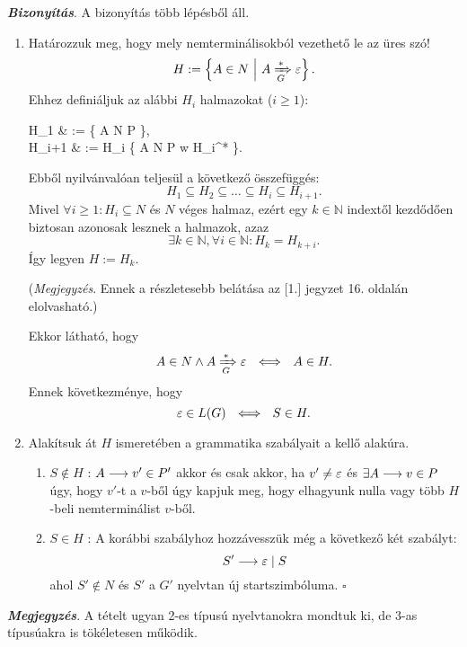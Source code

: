 \begin{mdframed}
	\textbf{\textit{Bizonyítás}}. A bizonyítás több lépésből áll.
	\begin{enumerate}[1.)]
		\item Határozzuk meg, hogy mely nemterminálisokból vezethető le az üres szó!
		\[ H := \left\{ A \in N ~ \middle\vert ~ A \xRightarrow[{G}]{*} \varepsilon \right\}. \]
		Ehhez definiáljuk az alábbi $H_i$ halmazokat ($i \geq 1$):
		\begin{flalign*}
			H_1 & := \left\{ A \in N \setdivbar \exists {} \in P \right\}, \\
			H_{i+1} & := H_i \cup \left\{ A \in N \setdivbar \exists {} \in P \land w \in H_i^* \right\}.
		\end{flalign*}
		Ebből nyilvánvalóan teljesül a következő összefüggés:
		\[ H_1 \subseteq H_2 \subseteq \dots \subseteq H_i \subseteq H_{i+1}. \] 
		Mivel $\forall i \geq 1: H_i \subseteq N$ és $N$ véges halmaz, ezért egy $k \in \mathbb{N}$ indextől kezdődően biztosan azonosak lesznek a halmazok, azaz \[ \exists k \in \mathbb{N}, \forall i \in \mathbb{N} : H_k = H_{k+i}. \] Így legyen $H := H_k$.
		
		(\textit{Megjegyzés}. Ennek a részletesebb belátása az [1.] jegyzet 16. oldalán elolvasható.)
		
		Ekkor látható, hogy 
		\[  A \in N \land A \xRightarrow[{G}]{*} \varepsilon ~~ \Longleftrightarrow ~~ A \in H. \] 
		Ennek következménye, hogy \[ \varepsilon \in L(G) ~~ \Longleftrightarrow ~~ S \in H. \]
		
		\item Alakítsuk át $H$ ismeretében a grammatika szabályait a kellő alakúra.
		\begin{enumerate}
			\item $\boxed{S \notin H}$ : $A \longrightarrow v'\in P'$ akkor és csak akkor, ha $v' \neq \varepsilon$ és $\exists A \longrightarrow v\in P$ úgy, hogy $v'$-t a $v$-ből úgy kapjuk meg, hogy elhagyunk nulla vagy több $H$-beli nemterminálist $v$-ből.
			\item $\boxed{S \in H}$ : A korábbi szabályhoz hozzávesszük még a következő két szabályt: 
			\[ S' \longrightarrow \varepsilon \mid S \] ahol $S' \notin N$ és $S'$ a $G'$ nyelvtan új startszimbóluma. $\square$
		\end{enumerate}
	\end{enumerate}
\end{mdframed}

\textbf{\textit{Megjegyzés}}. A tételt ugyan 2-es típusú nyelvtanokra mondtuk ki, de 3-as típusúakra is tökéletesen működik.

